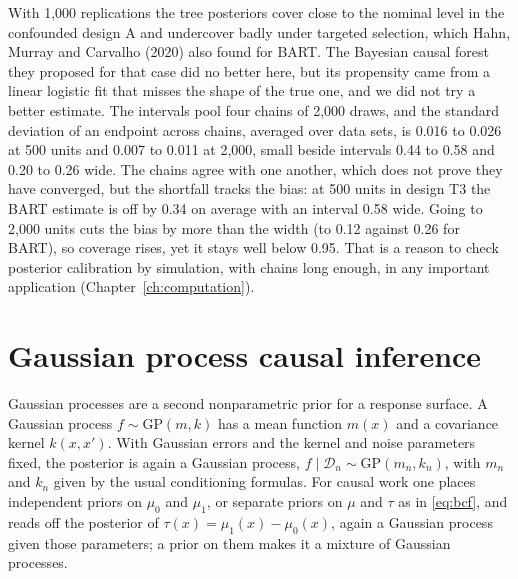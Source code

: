 With 1,000 replications the tree posteriors cover close to the nominal level in the confounded design A and undercover badly under targeted selection, which Hahn, Murray and Carvalho (2020) also found for BART. The Bayesian causal forest they proposed for that case did no better here, but its propensity came from a linear logistic fit that misses the shape of the true one, and we did not try a better estimate. The intervals pool four chains of 2,000 draws, and the standard deviation of an endpoint across chains, averaged over data sets, is 0.016 to 0.026 at 500 units and 0.007 to 0.011 at 2,000, small beside intervals 0.44 to 0.58 and 0.20 to 0.26 wide. The chains agree with one another, which does not prove they have converged, but the shortfall tracks the bias: at 500 units in design T3 the BART estimate is off by 0.34 on average with an interval 0.58 wide. Going to 2,000 units cuts the bias by more than the width (to 0.12 against 0.26 for BART), so coverage rises, yet it stays well below 0.95. That is a reason to check posterior calibration by simulation, with chains long enough, in any important application (Chapter~\ref{ch:computation}).

\section{Gaussian process causal inference}\label{sec:bart:gp}

Gaussian processes are a second nonparametric prior for a response surface. A Gaussian process $f \sim \mathrm{GP}(m, k)$ has a mean function $m(x)$ and a covariance kernel $k(x, x')$. With Gaussian errors and the kernel and noise parameters fixed, the posterior is again a Gaussian process, $f \mid \mathcal{D}_n \sim \mathrm{GP}(m_n, k_n)$, with $m_n$ and $k_n$ given by the usual conditioning formulas. For causal work one places independent priors on $\mu_0$ and $\mu_1$, or separate priors on $\mu$ and $\tau$ as in \eqref{eq:bcf}, and reads off the posterior of $\tau(x) = \mu_1(x) - \mu_0(x)$, again a Gaussian process given those parameters; a prior on them makes it a mixture of Gaussian processes.

